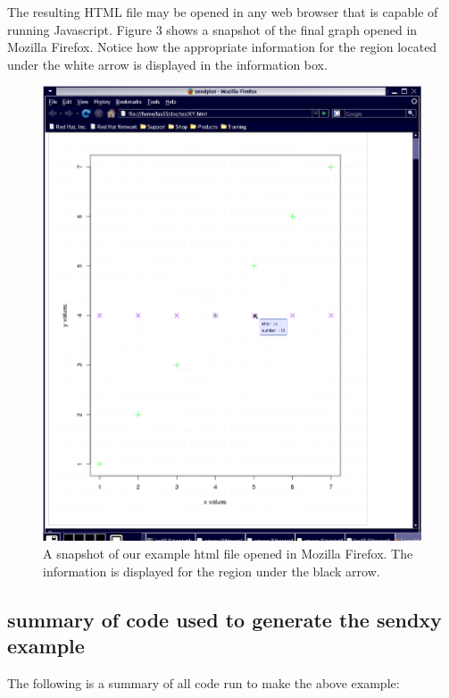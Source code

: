 \documentclass[]{article}
\begin{document}
The resulting HTML file may be opened in any web browser that is capable of running Javascript. Figure 3 shows a snapshot of the final graph opened in Mozilla Firefox. Notice how the appropriate information for the region located under the white arrow is displayed in the information box.
\begin{center}
\begin{figure}
\includegraphics{sendPlotScatter}
\caption{A snapshot of our example html file opened in Mozilla Firefox. The information is displayed for the region under the black arrow.}
\end{figure}
\end{center}



\subsection{summary of code used to generate the sendxy example}

 The following is a summary of all code run to make the above example:
\end{document}
